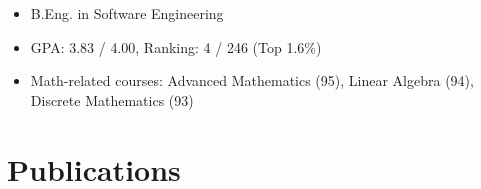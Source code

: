 \documentclass{resume}
\begin{document}
{
  \small
  \begin{itemize}
    \item B.Eng. in Software Engineering
    \item GPA: 3.83 / 4.00, Ranking: 4 / 246 (Top 1.6\%)
    \item Math-related courses: Advanced Mathematics (95), Linear Algebra (94), Discrete
          Mathematics (93)
  \end{itemize}
}

\section{Publications}
\end{document}
